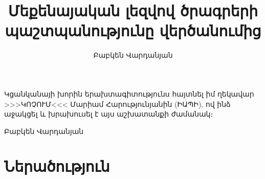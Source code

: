 \documentclass[12pt]{article}
\author{Բաբկեն Վարդանյան}
\title{Մեքենայական լեզվով ծրագրերի պաշտպանությունը վերծանումից}
\begin{document}
\setcounter{page}{1}

\maketitle
\newpage

Կցանկանայի խորին երախտագիտությունս հայտնել իմ ղեկավար >>>ԿՈՉՈՒՄ<<<
Մարիամ Հարությունյանին (ԻԱՊԻ), ով ինձ աջակցել և խրախուսել է այս աշխատանքի
ժամանակ։

\hfill \hfill Բաբկեն Վարդանյան

\newpage

\tableofcontents

\section{Ներածություն}
\end{document}
